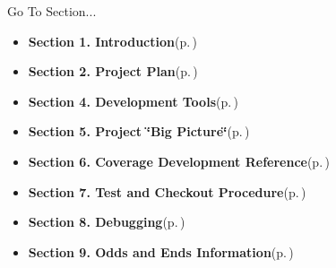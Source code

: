 \begin{Desc}
\item[Go To Section...]\begin{itemize}
\item {\bf Section 1.  Introduction}{\rm (p.\,\pageref{page_intro})}\item {\bf Section 2.  Project Plan}{\rm (p.\,\pageref{page_project_plan})}\item {\bf Section 4.  Development Tools}{\rm (p.\,\pageref{page_tools})}\item {\bf Section 5.  Project \char`\"{}Big Picture\char`\"{}}{\rm (p.\,\pageref{page_big_picture})}\item {\bf Section 6.  Coverage Development Reference}{\rm (p.\,\pageref{page_code_details})}\item {\bf Section 7.  Test and Checkout Procedure}{\rm (p.\,\pageref{page_testing})}\item {\bf Section 8.  Debugging}{\rm (p.\,\pageref{page_debugging})}\item {\bf Section 9.  Odds and Ends Information}{\rm (p.\,\pageref{page_misc})} \end{itemize}
\end{Desc}
